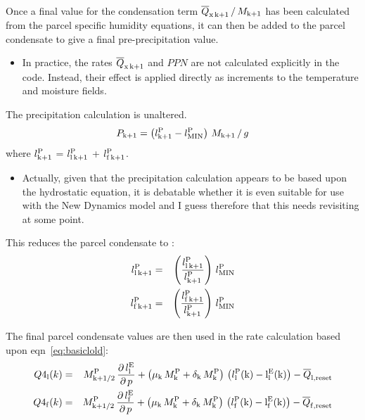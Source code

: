 \documentclass{UMDP_article}
\newcommand{\lsubsup}[2]{\ensuremath{l_{\rm{#1}}^{\rm{#2}}}}
\newcommand{\ov}{\overline}
\newcommand{\lp}{\left(}
\newcommand{\rp}{\right)}
\newcommand{\pardbyd}[2]{\ensuremath{\frac{\partial \, #1}{\partial \, #2}}}
\begin{document}
Once a final value for the condensation term 
$ {\ov{Q}}_{\rm{x} \, \rm{k} + 1} \, / \, M_{\rm{k} + 1} $ has been calculated
from the parcel specific humidity equations, it can then be added to the parcel
condensate to give a final pre-precipitation value.

\begin{itemize}
\item{In practice, the rates $ {\ov{Q}}_{\rm{x} \, \rm{k} + 1}$ and 
$ PPN $ are not calculated explicitly in the code.
Instead, their effect is applied directly as increments to the temperature and
moisture fields.}
\end{itemize}

The precipitation calculation is unaltered.
%
\begin{equation}
P_{\rm{k} + 1} = \lp { \lsubsup{k + 1}{P} - \lsubsup{MIN}{P} } \rp \, 
M_{\rm{k} + 1} \, / \, g
\label{eq:precip} \end{equation}
%
where \lsubsup{k + 1}{P} = \lsubsup{l \, k + 1}{P} + \lsubsup{f \, k + 1}{P}.

\begin{itemize}
\item{Actually, given that the precipitation calculation appears to be
based upon the hydrostatic equation, it is debatable whether it is even suitable
for use with the New Dynamics model and I guess therefore that this needs
revisiting at some point.}
\end{itemize} 

This reduces the parcel condensate to :
%
\begin{eqnarray}
\lsubsup{l \, k + 1}{P} & = & \lp { 
\frac{\lsubsup{l \, k + 1}{P}}{\lsubsup{k + 1}{P}}
} \rp \, \lsubsup{MIN}{P}  \label{eq:vparlfinal} \\
\lsubsup{f \, k + 1}{P} & = & \lp {
\frac{\lsubsup{f \, k + 1}{P}}{\lsubsup{k + 1}{P}}
} \rp \, \lsubsup{MIN}{P}  \label{eq:vparffinal} 
\end{eqnarray}

The final parcel condensate values are then used in the rate calculation based
upon eqn~\ref{eq:basiclold}:
%
\begin{eqnarray}
Q4_{\rm{l}}(k) & = &  M_{\rm{k+1/2}}^{\rm{P}} \, \pardbyd{\lsubsup{l}{E}}{p}   + 
\lp { {\mu}_{\rm{k}} \, M_{\rm{k}}^{\rm{P}} + 
{\delta}_{\rm{k}} \, M_{\rm{k}}^{\rm{P}} } \rp \, 
\lp { \lsubsup{l}{P}(\rm{k}) - \lsubsup{l}{E}(\rm{k}) } \rp -
{\ov{Q}}_{\rm{l, reset}}  \label{eq:q4lmassf} \\
Q4_{\rm{f}}(k) & = &  M_{\rm{k+1/2}}^{\rm{P}} \, \pardbyd{\lsubsup{f}{E}}{p}  +
\lp { {\mu}_{\rm{k}} \, M_{\rm{k}}^{\rm{P}} + 
{\delta}_{\rm{k}} \, M_{\rm{k}}^{\rm{P}} } \rp \, 
\lp { \lsubsup{f}{P}(\rm{k}) - \lsubsup{f}{E}(\rm{k}) } \rp - 
{\ov{Q}}_{\rm{f, reset}}  \label{eq:q4fmassf}
\end{eqnarray}
\end{document}
